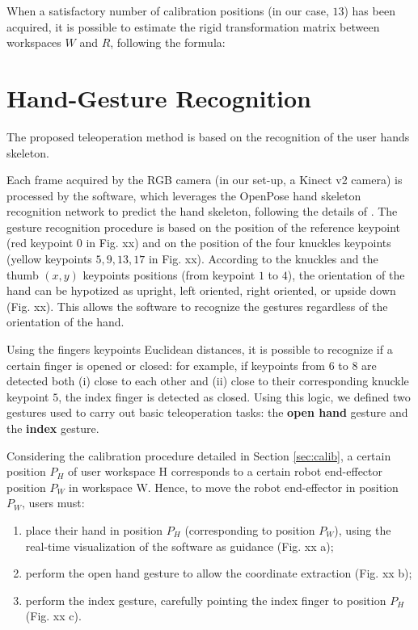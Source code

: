 \documentclass[letterpaper, 10 pt, conference]{ieeeconf}  %
\begin{document}
When a satisfactory number of calibration positions (in our case, $13$) has been acquired, it is possible to estimate the rigid transformation matrix between workspaces $W$ and $R$, following the formula: %

\section{Hand-Gesture Recognition}\label{sec:HG_recon}

The proposed teleoperation method is based on the recognition of the user hands skeleton.

Each frame acquired by the RGB camera (in our set-up, a Kinect v2 camera) is processed by the software, which leverages the OpenPose hand skeleton recognition network to predict the hand skeleton, following the details of \cite{simon2017hand}.
The gesture recognition procedure is based on the position of the reference keypoint (red keypoint $0$ in Fig. xx) and on the position of the four knuckles keypoints (yellow keypoints $5, 9, 13, 17$ in Fig. xx). According to the knuckles and the thumb $(x, y)$ keypoints positions (from keypoint $1$ to $4$), the orientation of the hand can be hypotized as upright, left oriented, right oriented, or upside down (Fig. xx). This allows the software to recognize the gestures regardless of the orientation of the hand. %

Using the fingers keypoints Euclidean distances, it is possible to recognize if a certain finger is opened or closed: for example, if keypoints from $6$ to $8$ are detected both (i) close to each other and (ii) close to their corresponding knuckle keypoint $5$, the index finger is detected as closed. 
Using this logic, we defined two gestures used to carry out basic teleoperation tasks: the \textbf{open hand} gesture and the \textbf{index} gesture.

Considering the calibration procedure detailed in Section \ref{sec:calib}, a certain position $P_H$ of user workspace H corresponds to a certain robot end-effector position $P_W$ in workspace W. Hence, to move the robot end-effector in position $P_W$, users must: %
\begin{enumerate}
\item place their hand in position $P_H$ (corresponding to position $P_W$), using the real-time visualization of the software as guidance (Fig. xx a);
\item perform the open hand gesture to allow the coordinate extraction (Fig. xx b);
\item perform the index gesture, carefully pointing the index finger to position $P_H$ (Fig. xx c).
\end{enumerate}
\end{document}
